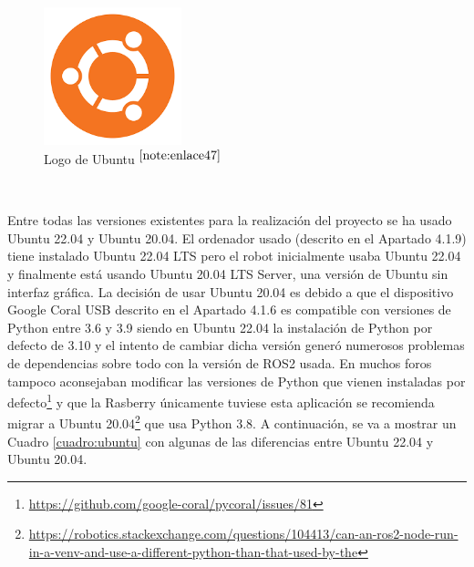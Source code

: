 \begin{figure} [h!]
	\begin{center}
		\includegraphics[width=4cm]{figs/ubuntu.png}
	\end{center}
	\caption{Logo de Ubuntu $^{\ref{note:enlace47}}$} 
	\label{fig:ubuntu}
\end{figure}\

\setcounter{footnote}{47} %

Entre todas las versiones existentes para la realización del proyecto se ha usado Ubuntu 22.04 y Ubuntu 20.04. El ordenador usado (descrito en el Apartado 4.1.9) tiene instalado Ubuntu 22.04 \ac{LTS} pero el robot inicialmente usaba Ubuntu 22.04 y finalmente está usando Ubuntu 20.04 \acs{LTS} Server, una versión de Ubuntu sin interfaz gráfica. La decisión de usar Ubuntu 20.04 es debido a que el dispositivo Google Coral USB descrito en el Apartado 4.1.6 es compatible con versiones de Python entre 3.6 y 3.9 siendo en Ubuntu 22.04 la instalación de Python por defecto de 3.10 y el intento de cambiar dicha versión generó numerosos problemas de dependencias sobre todo con la versión de ROS2 usada. En muchos foros tampoco aconsejaban modificar las versiones de Python que vienen instaladas por defecto\footnote{\url{https://github.com/google-coral/pycoral/issues/81}} y que la Rasberry únicamente tuviese esta aplicación se recomienda migrar a Ubuntu 20.04\footnote{\url{https://robotics.stackexchange.com/questions/104413/can-an-ros2-node-run-in-a-venv-and-use-a-different-python-than-that-used-by-the}} que usa Python 3.8. A continuación, se va a mostrar un Cuadro \ref{cuadro:ubuntu} con algunas de las diferencias entre Ubuntu 22.04 y Ubuntu 20.04.

